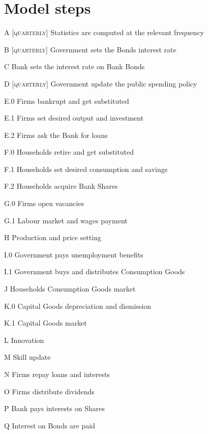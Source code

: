 \documentclass[a4paper, headings=standardclasses]{scrartcl}
\begin{document}
\section{Model steps}
\begin{steps}
    \item[A] [\textsc{quarterly}] Statistics are computed at the relevant frequency
    \item[B] [\textsc{quarterly}] Government sets the Bonds interest rate
    \item[C] Bank sets the interest rate on Bank Bonds
    \item[D] [\textsc{quarterly}] Government update the public spending policy
    \item[E.0] Firms bankrupt and get substituted
    \item[E.1] Firms set desired output and investment
    \item[E.2] Firms ask the Bank for loans
    \item[F.0] Households retire and get substituted
    \item[F.1] Households set desired consumption and savings
    \item[F.2] Households acquire Bank Shares
    \item[G.0] Firms open vacancies
    \item[G.1] Labour market and wages payment
    \item[H] Production and price setting
    \item[I.0] Government pays unemployment benefits
    \item[I.1] Government buys and distributes Consumption Goods
    \item[J] Households Consumption Goods market
    \item[K.0] Capital Goods depreciation and dismission
    \item[K.1] Capital Goods market
    \item[L] Innovation
    \item[M] Skill update
    \item[N] Firms repay loans and interests
    \item[O] Firms distribute dividends
    \item[P] Bank pays interests on Shares
    \item[Q] Interest on Bonds are paid
\end{steps}

\end{document}
